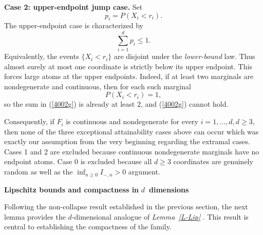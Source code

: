 \documentclass[onecolumn]{article}
\begin{document}
\noindent \textbf{Case 2: upper-endpoint jump case.} Set 
\begin{equation}
p_{i}=P(X_{i}<r_{i}).  \label{4002f}
\end{equation}%
The upper-endpoint case is characterized by 
\begin{equation}
\sum_{i=1}^{d}p_{i}\leq 1.  \label{4002g}
\end{equation}%
Equivalently, the events $\{X_{i}<r_{i}\}$ are disjoint under the \textit{%
lower-bound} law. Thus almost surely at most one coordinate is strictly
below its upper endpoint. This forces large atoms at the upper endpoints.
Indeed, if at least two marginals are nondegenerate and continuous, then for
each such marginal 
\begin{equation}
P(X_{i}<r_{i})=1,  \label{4002h}
\end{equation}%
so the sum in (\ref{4002g}) is already at least $2$, and (\ref{4002g})
cannot hold.

\smallskip

Consequently, if $F_{i}$ is continuous and nondegenerate for every $%
i=1,\ldots ,d,d\geq 3$, then none of the three exceptional attainability
cases above can occur which was exactly our assumption from the very
beginning regarding the extramal cases. Cases 1 and 2 are excluded because
continuous nondegenerate marginals have no endpoint atoms. Case 0 is
excluded because all $d\geq 3$ coordinates are genuinely random as well as
the $\inf_{n\geq 0}I_{-,n}>0$ argument.

\begin{flushleft}
\textbf{Lipschitz bounds and compactness in }$d$\textbf{\ dimensions}
\end{flushleft}

Following the non-collapse result established in the previous section, the
next lemma provides the $d$-dimensional analogue of \textit{Lemma~\ref{L-Lip}%
}. This result is central to establishing the compactness of the family.
\end{document}
